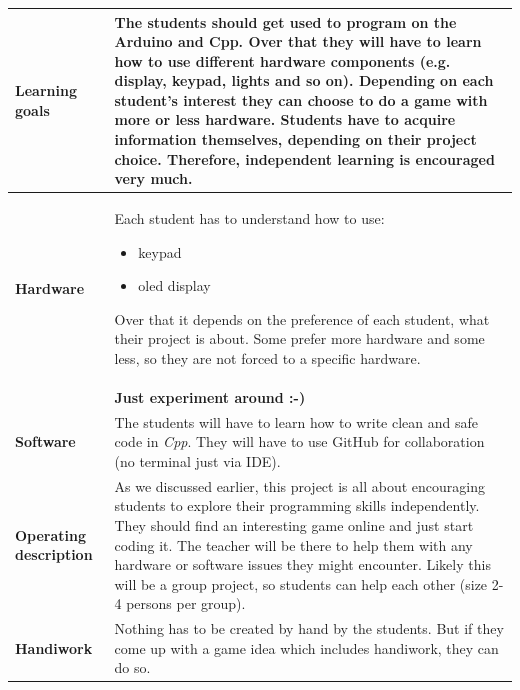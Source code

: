 \documentclass[10pt]{article}
\begin{document}
\begin{longtable}{|p{3.5cm}|p{11cm}|}
  \textbf{Learning goals} & The students should get used to program on the Arduino and Cpp. Over that they will have to learn how to use different hardware components (e.g. display, keypad, lights and so on). Depending on each student's interest they can choose to do a game with more or less hardware. Students have to acquire information themselves, depending on their project choice. Therefore, independent learning is encouraged very much. \\ \hline
  
  \textbf{Hardware} & Each student has to understand how to use:
  \begin{itemize}
    \item keypad
    \item oled display
  \end{itemize} 
  Over that it depends on the preference of each student, what their project is about. Some prefer more hardware and some less, so they are not forced to a specific hardware. \\ & \textbf{Just experiment around :-)}
  \\ \hline
  
  \textbf{Software} & The students will have to learn how to write clean and safe code in \textit{Cpp}. They will have to use GitHub for collaboration (no terminal just via IDE).  \\ \hline
  
  \textbf{Operating description} & As we discussed earlier, this project is all about encouraging students to explore their programming skills independently. They should find an interesting game online and just start coding it. The teacher will be there to help them with any hardware or software issues they might encounter. Likely this will be a group project, so students can help each other (size 2-4 persons per group).
  \\ \hline
  
  \textbf{Handiwork} & Nothing has to be created by hand by the students. But if they come up with a game idea which includes handiwork, they can do so. \\ \hline
  

\end{longtable}
\end{document}
